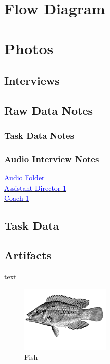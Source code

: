 \documentclass[12pt]{article} %
\begin{document}
\section{Flow Diagram}



\section{Photos} %

\subsection{Interviews} %

\subsection{Raw Data Notes} %
  \subsubsection{Task Data Notes} %
  \subsubsection{Audio Interview Notes} %
  \href{http://www.dropbox.specialorange.com/vt/5714%20UX/}{\textcolor{blue}{Audio Folder}}\\
  \href{http://www.dropbox.specialorange.com/vt/5714%20UX/ADir1.aac}{\textcolor{blue}{Assistant Director 1}}\\
  \hspace{1.5cm}\href{http://www.dropbox.specialorange.com/vt/5714%20UX/C1.aac}{\textcolor{blue}{Coach 1}}\\

\subsection{Task Data} %

\subsection{Artifacts} %

text
\begin{figure} %
  \begin{center}
    \includegraphics[width=0.38\textwidth]{fish}
  \end{center}
  \caption{Fish}
\end{figure}
\end{document}
